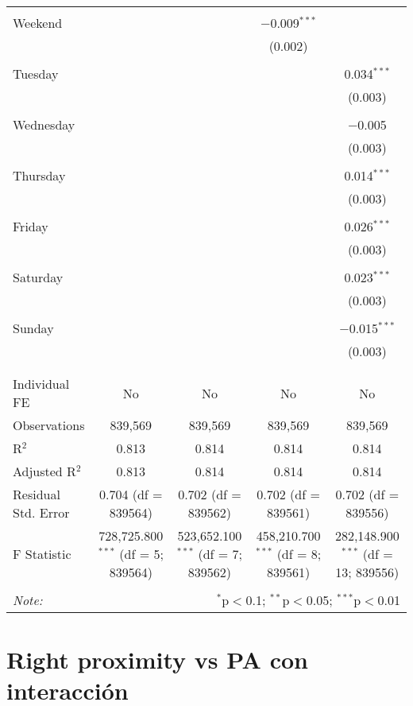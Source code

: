 \documentclass[
]{article}
\begin{document}
\begin{table}[!htbp]
{\begin{tabular}{@{\extracolsep{5pt}}lcccc}
  & & & & \\ 
 Weekend &  &  & $-$0.009$^{***}$ &  \\ 
  &  &  & (0.002) &  \\ 
  & & & & \\ 
 Tuesday &  &  &  & 0.034$^{***}$ \\ 
  &  &  &  & (0.003) \\ 
  & & & & \\ 
 Wednesday &  &  &  & $-$0.005 \\ 
  &  &  &  & (0.003) \\ 
  & & & & \\ 
 Thursday &  &  &  & 0.014$^{***}$ \\ 
  &  &  &  & (0.003) \\ 
  & & & & \\ 
 Friday &  &  &  & 0.026$^{***}$ \\ 
  &  &  &  & (0.003) \\ 
  & & & & \\ 
 Saturday &  &  &  & 0.023$^{***}$ \\ 
  &  &  &  & (0.003) \\ 
  & & & & \\ 
 Sunday &  &  &  & $-$0.015$^{***}$ \\ 
  &  &  &  & (0.003) \\ 
  & & & & \\ 
\hline \\[-1.8ex] 
Individual FE & No & No & No & No \\ 
Observations & 839,569 & 839,569 & 839,569 & 839,569 \\ 
R$^{2}$ & 0.813 & 0.814 & 0.814 & 0.814 \\ 
Adjusted R$^{2}$ & 0.813 & 0.814 & 0.814 & 0.814 \\ 
Residual Std. Error & 0.704 (df = 839564) & 0.702 (df = 839562) & 0.702 (df = 839561) & 0.702 (df = 839556) \\ 
F Statistic & 728,725.800$^{***}$ (df = 5; 839564) & 523,652.100$^{***}$ (df = 7; 839562) & 458,210.700$^{***}$ (df = 8; 839561) & 282,148.900$^{***}$ (df = 13; 839556) \\ 
\hline 
\hline \\[-1.8ex] 
\textit{Note:}  & \multicolumn{4}{r}{$^{*}$p$<$0.1; $^{**}$p$<$0.05; $^{***}$p$<$0.01} \\ 
\end{tabular}
} 
\end{table} 
\newpage
\section{Right proximity vs PA con interacción}
\end{document}
